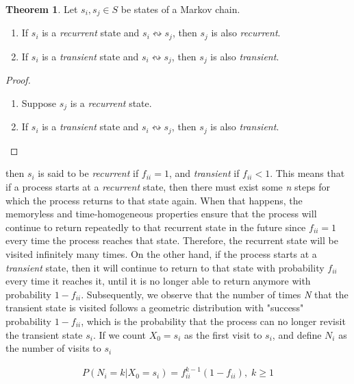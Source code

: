 \documentclass[a4paper,12pt]{article}
\theoremstyle{definition}
\newtheorem{theorem}{Theorem}[subsection]
\begin{document}
	\begin{theorem}
		Let $s_i, s_j \in S$ be states of a Markov chain.
		\begin{enumerate}
			\item If $s_i$ is a \emph{recurrent} state and $s_i \leftrightsquigarrow s_j$, then $s_j$ is also \emph{recurrent}.
			\item If $s_i$ is a \emph{transient} state and $s_i \leftrightsquigarrow s_j$, then $s_j$ is also \emph{transient}.
		\end{enumerate}
	\end{theorem}
	\begin{proof}
		\begin{enumerate}
			\item Suppose $s_j$ is a \emph{recurrent} state.
			\item If $s_i$ is a \emph{transient} state and $s_i \leftrightsquigarrow s_j$, then $s_j$ is also \emph{transient}.
		\end{enumerate}
	\end{proof}


	then $s_i$ is said to be \emph{recurrent} if $f_{ii} = 1$, and \emph{transient} if $f_{ii} < 1$. This means that if a process starts at a \emph{recurrent} state, then there must exist some \emph{n} steps for which the process returns to that state again. When that happens, the memoryless and time-homogeneous properties ensure that the process will continue to return repeatedly to that recurrent state in the future since $f_{ii} = 1$ every time the process reaches that state.  Therefore, the recurrent state will be visited infinitely many times. On the other hand, if the process starts at a \emph{transient} state, then it will continue to return to that state with probability $f_{ii}$ every time it reaches it, until it is no longer able to return anymore with probability $1 - f_{ii}$. Subsequently, we observe that the number of times \emph{N} that the transient state is visited follows a geometric distribution with "success" probability $1 - f_{ii}$, which is the probability that the process can no longer revisit the transient state $s_i$. If we  count $X_0 = s_i$ as the first visit to $s_i$, and define $N_i$ as the number of visits to $s_i$
	
	\begin{equation*}
	\begin{aligned}
		 P(N_i = k | X_0 = s_i) = f_{ii}^{k-1}(1-f_{ii}), \; k\geq1
	\end{aligned}
	\end{equation*}		
	
\end{document}
